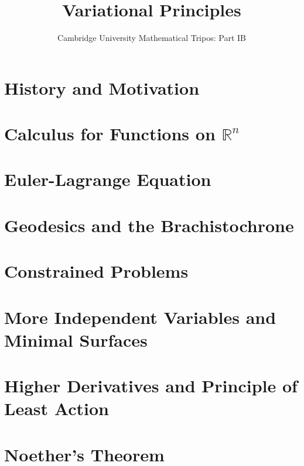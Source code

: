 \documentclass{article}
\title{Variational Principles}
\author{Cambridge University Mathematical Tripos: Part IB}
\begin{document}
\maketitle

\tableofcontentsnewpage{}

\section{History and Motivation}

\section{Calculus for Functions on \(\mathbb R^n\)}

\section{Euler-Lagrange Equation}

\section{Geodesics and the Brachistochrone}

\section{Constrained Problems}

\section{More Independent Variables and Minimal Surfaces}

\section{Higher Derivatives and Principle of Least Action}

\section{Noether's Theorem}

\end{document}
